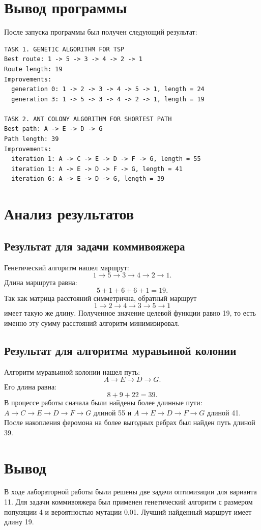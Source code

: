 \documentclass[12pt,a4paper]{article}
\begin{document}
\section{Вывод программы}
После запуска программы был получен следующий результат:

\begin{lstlisting}[caption={Вывод программы},language={}]
TASK 1. GENETIC ALGORITHM FOR TSP
Best route: 1 -> 5 -> 3 -> 4 -> 2 -> 1
Route length: 19
Improvements:
  generation 0: 1 -> 2 -> 3 -> 4 -> 5 -> 1, length = 24
  generation 3: 1 -> 5 -> 3 -> 4 -> 2 -> 1, length = 19

TASK 2. ANT COLONY ALGORITHM FOR SHORTEST PATH
Best path: A -> E -> D -> G
Path length: 39
Improvements:
  iteration 1: A -> C -> E -> D -> F -> G, length = 55
  iteration 1: A -> E -> D -> F -> G, length = 41
  iteration 6: A -> E -> D -> G, length = 39
\end{lstlisting}

\section{Анализ результатов}
\subsection{Результат для задачи коммивояжера}
Генетический алгоритм нашел маршрут:
\[
1 \rightarrow 5 \rightarrow 3 \rightarrow 4 \rightarrow 2 \rightarrow 1.
\]
Длина маршрута равна:
\[
5 + 1 + 6 + 6 + 1 = 19.
\]
Так как матрица расстояний симметрична, обратный маршрут
\[
1 \rightarrow 2 \rightarrow 4 \rightarrow 3 \rightarrow 5 \rightarrow 1
\]
имеет такую же длину. Полученное значение целевой функции равно 19, то есть именно эту сумму расстояний алгоритм минимизировал.

\subsection{Результат для алгоритма муравьиной колонии}
Алгоритм муравьиной колонии нашел путь:
\[
A \rightarrow E \rightarrow D \rightarrow G.
\]
Его длина равна:
\[
8 + 9 + 22 = 39.
\]
В процессе работы сначала были найдены более длинные пути: $A \rightarrow C \rightarrow E \rightarrow D \rightarrow F \rightarrow G$ длиной 55 и $A \rightarrow E \rightarrow D \rightarrow F \rightarrow G$ длиной 41. После накопления феромона на более выгодных ребрах был найден путь длиной 39.

\section{Вывод}
В ходе лабораторной работы были решены две задачи оптимизации для варианта 11. Для задачи коммивояжера был применен генетический алгоритм с размером популяции 4 и вероятностью мутации 0,01. Лучший найденный маршрут имеет длину 19.
\end{document}
